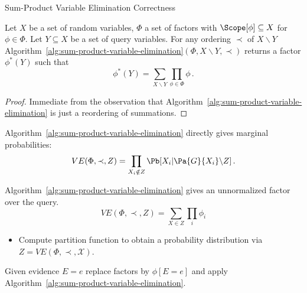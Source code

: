\begin{frame}{Sum-Product Variable Elimination Correctness}
\begin{theorem}
Let $X$ be a set of random variables, $\Phi$ a set of factors with $\Scope[\phi] \subseteq X$ for $\phi \in \Phi$.
Let $Y \subseteq X$ be a set of query variables. For any ordering $\prec$ of $X \backslash Y$ Algorithm~\ref{alg:sum-product-variable-elimination}$(\Phi, X \backslash Y, \prec)$ returns a factor $\phi^*(Y)$ such that
\begin{equation}
    \phi^*(Y) = \sum_{X \backslash Y} \prod_{\phi \in \Phi} \phi\,.
\end{equation}
\end{theorem}
\pause
\begin{proof}
Immediate from the observation that Algorithm~\ref{alg:sum-product-variable-elimination} is just a reordering of summations.
\end{proof}
\begin{description}
    \pause \item[Bayesian Network:] Algorithm~\ref{alg:sum-product-variable-elimination} directly gives marginal probabilities:
\begin{equation}
    VE(\Phi, \prec, Z) = \prod_{X_i \notin Z} \Pb[X_i | \Pa{G}{X_i} \backslash Z]\,.
\end{equation}
    \pause \item[Markov Network:] Algorithm~\ref{alg:sum-product-variable-elimination} gives an unnormalized factor over the query. 
    \begin{equation}
    VE(\Phi, \prec, Z) = \sum_{X \in Z} \prod_{i} \phi_i 
    \end{equation}
    \begin{itemize}
        \pause \item Compute partition function to obtain a probability distribution via
        $Z = VE(\Phi, \prec, \mathcal{X})$.
    \end{itemize}
    \pause \item[Evidence:] Given evidence $E = e$ replace factors by $\phi[E = e]$ and apply Algorithm~\ref{alg:sum-product-variable-elimination}.
\end{description}
\end{frame}

